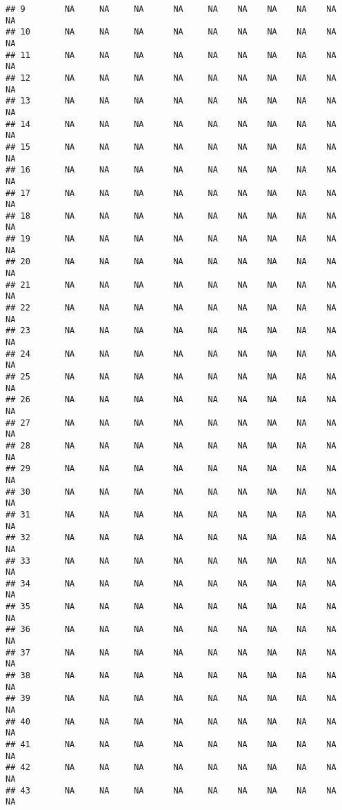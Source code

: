 \documentclass{article}\usepackage{graphicx, color}
\makeatletter
\newenvironment{kframe}{%
 \def\at@end@of@kframe{}%
 \ifinner\ifhmode%
  \def\at@end@of@kframe{\end{minipage}}%
  \begin{minipage}{\columnwidth}%
 \fi\fi%
 \def\FrameCommand##1{\hskip\@totalleftmargin \hskip-\fboxsep
 \colorbox{shadecolor}{##1}\hskip-\fboxsep
     \hskip-\linewidth \hskip-\@totalleftmargin \hskip\columnwidth}%
 \MakeFramed {\advance\hsize-\width
   \@totalleftmargin\z@ \linewidth\hsize
   \@setminipage}}%
 {\par\unskip\endMakeFramed%
 \at@end@of@kframe}
\newenvironment{knitrout}{}{} %
\makeatother
\begin{document}
\begin{knitrout}
\begin{kframe}
\begin{verbatim}
## 9        NA     NA     NA      NA     NA    NA    NA    NA    NA     NA
## 10       NA     NA     NA      NA     NA    NA    NA    NA    NA     NA
## 11       NA     NA     NA      NA     NA    NA    NA    NA    NA     NA
## 12       NA     NA     NA      NA     NA    NA    NA    NA    NA     NA
## 13       NA     NA     NA      NA     NA    NA    NA    NA    NA     NA
## 14       NA     NA     NA      NA     NA    NA    NA    NA    NA     NA
## 15       NA     NA     NA      NA     NA    NA    NA    NA    NA     NA
## 16       NA     NA     NA      NA     NA    NA    NA    NA    NA     NA
## 17       NA     NA     NA      NA     NA    NA    NA    NA    NA     NA
## 18       NA     NA     NA      NA     NA    NA    NA    NA    NA     NA
## 19       NA     NA     NA      NA     NA    NA    NA    NA    NA     NA
## 20       NA     NA     NA      NA     NA    NA    NA    NA    NA     NA
## 21       NA     NA     NA      NA     NA    NA    NA    NA    NA     NA
## 22       NA     NA     NA      NA     NA    NA    NA    NA    NA     NA
## 23       NA     NA     NA      NA     NA    NA    NA    NA    NA     NA
## 24       NA     NA     NA      NA     NA    NA    NA    NA    NA     NA
## 25       NA     NA     NA      NA     NA    NA    NA    NA    NA     NA
## 26       NA     NA     NA      NA     NA    NA    NA    NA    NA     NA
## 27       NA     NA     NA      NA     NA    NA    NA    NA    NA     NA
## 28       NA     NA     NA      NA     NA    NA    NA    NA    NA     NA
## 29       NA     NA     NA      NA     NA    NA    NA    NA    NA     NA
## 30       NA     NA     NA      NA     NA    NA    NA    NA    NA     NA
## 31       NA     NA     NA      NA     NA    NA    NA    NA    NA     NA
## 32       NA     NA     NA      NA     NA    NA    NA    NA    NA     NA
## 33       NA     NA     NA      NA     NA    NA    NA    NA    NA     NA
## 34       NA     NA     NA      NA     NA    NA    NA    NA    NA     NA
## 35       NA     NA     NA      NA     NA    NA    NA    NA    NA     NA
## 36       NA     NA     NA      NA     NA    NA    NA    NA    NA     NA
## 37       NA     NA     NA      NA     NA    NA    NA    NA    NA     NA
## 38       NA     NA     NA      NA     NA    NA    NA    NA    NA     NA
## 39       NA     NA     NA      NA     NA    NA    NA    NA    NA     NA
## 40       NA     NA     NA      NA     NA    NA    NA    NA    NA     NA
## 41       NA     NA     NA      NA     NA    NA    NA    NA    NA     NA
## 42       NA     NA     NA      NA     NA    NA    NA    NA    NA     NA
## 43       NA     NA     NA      NA     NA    NA    NA    NA    NA     NA

\end{verbatim}
\end{kframe}
\end{knitrout}
\end{document}
